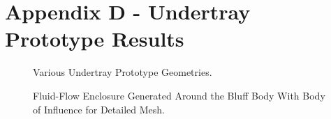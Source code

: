 \newpage
\flushleft
\section*{Appendix D - Undertray Prototype Results} 


\begin{figure}[!htb]
    \centering
    \noindent{}
    \caption{Various Undertray Prototype Geometries.}
    \label{fig:UTP_D}
\end{figure}

\begin{figure}[!htb]
    \centering
    \noindent{}
    \caption{Fluid-Flow Enclosure Generated Around the Bluff Body With Body of Influence for Detailed Mesh.}
    \label{fig:UTP_Fluid_flow}
\end{figure}



